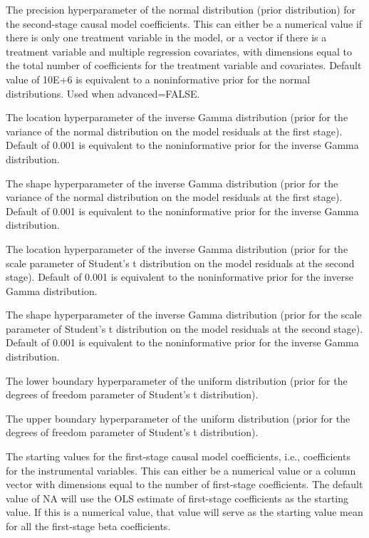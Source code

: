 \documentclass[a4paper]{book}
\begin{document}
\begin{Arguments}
\begin{ldescription}
\item[\code{G0}] The precision hyperparameter of the normal distribution (prior distribution)
for the second-stage causal model coefficients.
This can either be a numerical value if there is only one treatment variable in the model,
or a vector if there is a treatment variable and multiple regression covariates,
with dimensions equal to the total number of coefficients for the treatment variable and covariates.
Default value of 10E+6 is equivalent to a noninformative prior for the normal distributions.
Used when advanced=FALSE.

\item[\code{u0}] The location hyperparameter of the inverse Gamma distribution (prior for the variance of the
normal distribution on the model residuals at the first stage).
Default of 0.001 is equivalent to the noninformative prior for the inverse Gamma distribution.

\item[\code{U0}] The shape hyperparameter of the inverse Gamma distribution (prior for the variance of the
normal distribution on the model residuals at the first stage).
Default of 0.001 is equivalent to the noninformative prior for the inverse Gamma distribution.

\item[\code{e0}] The location hyperparameter of the inverse Gamma distribution (prior for the scale parameter
of Student's t distribution on the model residuals at the second stage).
Default of 0.001 is equivalent to the noninformative prior for the inverse Gamma distribution.

\item[\code{E0}] The shape hyperparameter of the inverse Gamma distribution (prior for the scale parameter
of Student's t distribution on the model residuals at the second stage).
Default of 0.001 is equivalent to the noninformative prior for the inverse Gamma distribution.

\item[\code{v0}] The lower boundary hyperparameter of the uniform distribution (prior for the degrees of freedom
parameter of Student's t distribution).

\item[\code{V0}] The upper boundary hyperparameter of the uniform distribution (prior for the degrees of freedom
parameter of Student's t distribution).

\item[\code{beta.start}] The starting values for the first-stage causal model coefficients,
i.e., coefficients for the instrumental variables.
This can either be a numerical value or a column vector with dimensions
equal to the number of first-stage coefficients.
The default value of NA will use the OLS estimate of first-stage coefficients as the starting value.
If this is a numerical value, that value will
serve as the starting value mean for all the first-stage beta coefficients.


\end{ldescription}
\end{Arguments}
\end{document}
